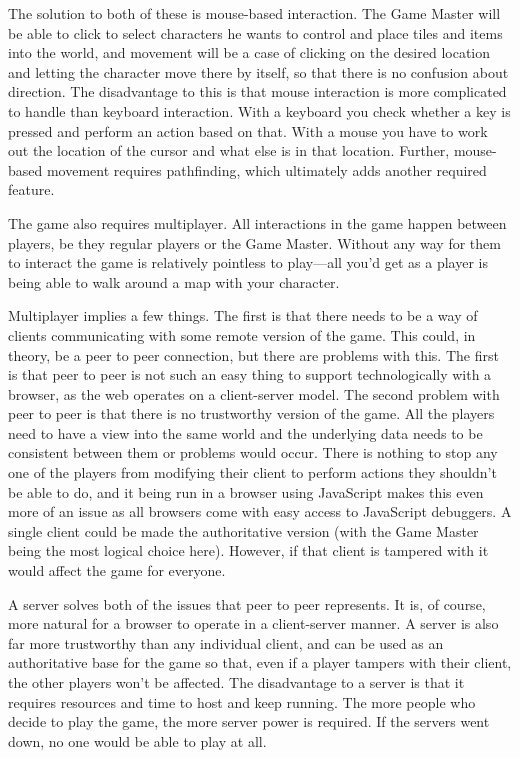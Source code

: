 The solution to both of these is mouse-based interaction. The Game Master will be able to click to select characters he wants to control and place tiles and items into the world, and movement will be a case of clicking on the desired location and letting the character move there by itself, so that there is no confusion about direction. The disadvantage to this is that mouse interaction is more complicated to handle than keyboard interaction. With a keyboard you check whether a key is pressed and perform an action based on that. With a mouse you have to work out the location of the cursor and what else is in that location. Further, mouse-based movement requires pathfinding, which ultimately adds another required feature.

The game also requires multiplayer. All interactions in the game happen between players, be they regular players or the Game Master. Without any way for them to interact the game is relatively pointless to play---all you'd get as a player is being able to walk around a map with your character.

Multiplayer implies a few things. The first is that there needs to be a way of clients communicating with some remote version of the game. This could, in theory, be a peer to peer connection, but there are problems with this. The first is that peer to peer is not such an easy thing to support technologically with a browser, as the web operates on a client-server model. The second problem with peer to peer is that there is no trustworthy version of the game. All the players need to have a view into the same world and the underlying data needs to be consistent between them or problems would occur. There is nothing to stop any one of the players from modifying their client to perform actions they shouldn't be able to do, and it being run in a browser using JavaScript makes this even more of an issue as all browsers come with easy access to JavaScript debuggers. A single client could be made the authoritative version (with the Game Master being the most logical choice here). However, if that client is tampered with it would affect the game for everyone.

A server solves both of the issues that peer to peer represents. It is, of course, more natural for a browser to operate in a client-server manner. A server is also far more trustworthy than any individual client, and can be used as an authoritative base for the game so that, even if a player tampers with their client, the other players won't be affected. The disadvantage to a server is that it requires resources and time to host and keep running. The more people who decide to play the game, the more server power is required. If the servers went down, no one would be able to play at all.

